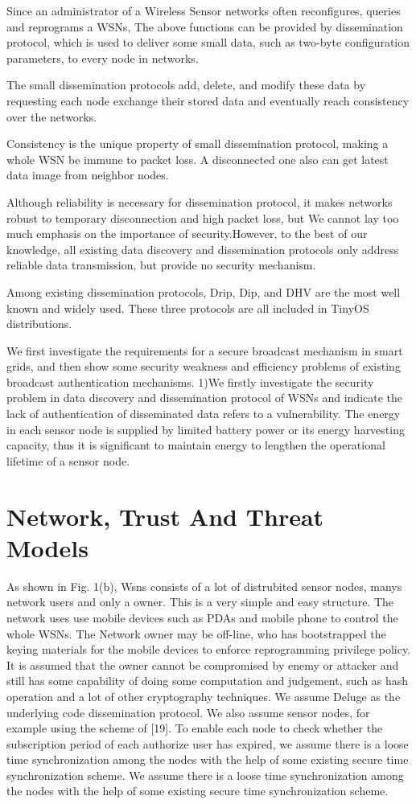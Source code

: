 \documentclass[lnicst,sechang,a4paper]{svmultln}
\begin{document}
Since an administrator of a Wireless Sensor networks often reconfigures, queries and reprograms a WSNs, The above functions can be provided by dissemination protocol, which is used to deliver some small data, such as two-byte configuration parameters, to every node in networks.

The small dissemination protocols add, delete, and modify these data by requesting each node exchange their stored data and eventually reach consistency over the networks.

Consistency is the unique property of small dissemination protocol, making a whole WSN be immune to packet loss. A disconnected one also can get latest data image from neighbor nodes.

Although reliability is necessary for dissemination protocol, it makes networks robust to temporary disconnection and high packet loss, but We cannot lay too much emphasis on the importance of security.However, to the best of our knowledge, all existing data discovery and dissemination protocols only address reliable data transmission, but provide no security mechanism.

Among existing dissemination protocols, Drip, Dip, and DHV are the most well known and widely used. These three protocols are all included in TinyOS distributions.

We first investigate the requirements for a secure broadcast mechanism in smart grids, and then show some security weakness and efficiency problems of existing broadcast authentication mechanisms.
1)We firstly investigate the security problem in data discovery and dissemination protocol of WSNs and indicate the lack of authentication of disseminated data refers to a vulnerability. The energy in each sensor node is supplied by limited battery power or its energy harvesting capacity, thus it is significant to maintain energy to lengthen the operational lifetime of a sensor node.

\section{Network, Trust And Threat Models}
As shown in Fig. 1(b), Wsns consists of a lot of distrubited sensor nodes, manys network users and only a owner. This is a very simple and easy structure. The network uses use mobile devices such as PDAs and mobile phone to control the whole WSNs. The Network owner may be off-line, who has bootstrapped the keying materials for the mobile devices to enforce reprogramming privilege policy. It is assumed that the owner cannot be compromised by enemy or attacker and still has some capability of doing some computation and judgement, such as hash operation and  a lot of other cryptography techniques. We assume Deluge as the underlying code dissemination protocol. We also assume sensor nodes, for example using the scheme of [19]. To enable each node to check whether the subscription period of each authorize user has expired, we assume there is a loose time synchronization among the nodes with the help of some existing secure time synchronization scheme.
We assume there is a loose time synchronization among the nodes with the help of some existing secure time synchronization scheme.
\end{document}
